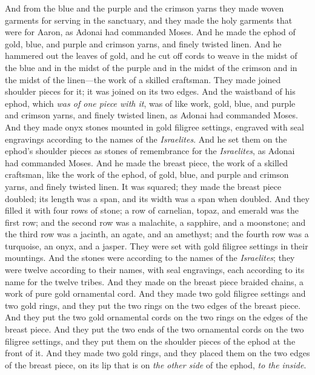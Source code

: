\begin{biblechapter} %
 And from the blue and the purple and the crimson yarns they made woven garments for serving in the sanctuary, and they made the holy garments that were for Aaron, as Adonai had commanded Moses.
\verse And he made the ephod of gold, blue, and purple and crimson yarns, and finely twisted linen.
\verse And he hammered out the leaves of gold, and he cut off cords to weave in the midst of the blue and in the midst of the purple and in the midst of the crimson and in the midst of the linen—the work of a skilled craftsman.
\verse They made joined shoulder pieces for it; it was joined on its two edges.
\verse And the waistband of his ephod, which \textit{was of one piece with it}, was of like work, gold, blue, and purple and crimson yarns, and finely twisted linen, as Adonai had commanded Moses.
\verse And they made onyx stones mounted in gold filigree settings, engraved with seal engravings according to the names of the \textit{Israelites}.
\verse And he set them on the ephod’s shoulder pieces as stones of remembrance for the \textit{Israelites}, as Adonai had commanded Moses.
\verse And he made the breast piece, the work of a skilled craftsman, like the work of the ephod, of gold, blue, and purple and crimson yarns, and finely twisted linen.
\verse It was squared; they made the breast piece doubled; its length was a span, and its width was a span when doubled.
\verse And they filled it with four rows of stone; a row of carnelian, topaz, and emerald was the first row;
\verse and the second row was a malachite, a sapphire, and a moonstone;
\verse and the third row was a jacinth, an agate, and an amethyst;
\verse and the fourth row was a turquoise, an onyx, and a jasper. They were set with gold filigree settings in their mountings.
\verse And the stones were according to the names of the \textit{Israelites}; they were twelve according to their names, with seal engravings, each according to its name for the twelve tribes.
\verse And they made on the breast piece braided chains, a work of pure gold ornamental cord.
\verse And they made two gold filigree settings and two gold rings, and they put the two rings on the two edges of the breast piece.
\verse And they put the two gold ornamental cords on the two rings on the edges of the breast piece.
\verse And they put the two ends of the two ornamental cords on the two filigree settings, and they put them on the shoulder pieces of the ephod at the front of it.
\verse And they made two gold rings, and they placed them on the two edges of the breast piece, on its lip that is on \textit{the other side} of the ephod, \textit{to the inside}.

\end{biblechapter}
